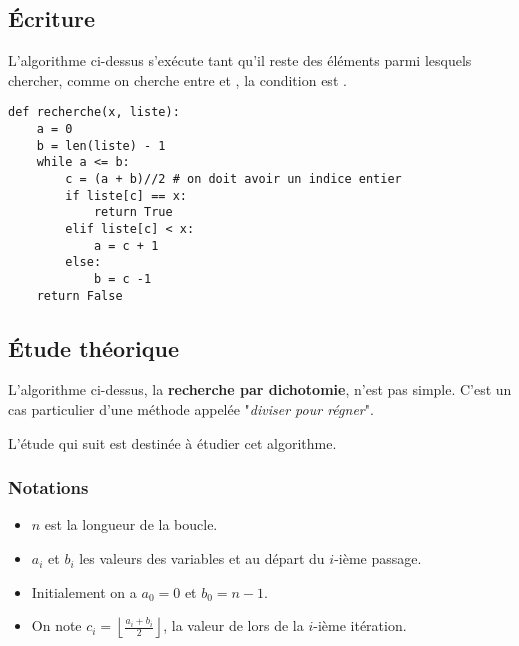 \subsection{Écriture}

L'algorithme ci-dessus s'exécute tant qu'il reste des éléments parmi lesquels chercher, comme on cherche entre 
 et , la condition est .
\begin{lstlisting}
def recherche(x, liste): 
    a = 0
    b = len(liste) - 1
    while a <= b:
        c = (a + b)//2 # on doit avoir un indice entier
        if liste[c] == x:
            return True
        elif liste[c] < x:
            a = c + 1
        else:
            b = c -1
    return False 
\end{lstlisting}
\subsection{Étude théorique}
L'algorithme ci-dessus, la {\bf recherche par dichotomie}, n'est pas simple. C'est un cas particulier d'une méthode appelée "{\it diviser pour régner}".

L'étude qui suit est destinée à étudier cet algorithme.

\subsubsection{Notations}
\begin{itemize}
    \item $n$ est la longueur de la boucle.
    \item $a_i$ et $b_i$ les valeurs des variables  et  au départ du $i$-ième passage.
    \item Initialement on a $a_0=0$ et $b_0 = n-1$.
    \item On note $c_i = \left\lfloor\frac{a_i + b_i}2\right\rfloor$, la valeur de  lors de la $i$-ième itération.
\end{itemize}


